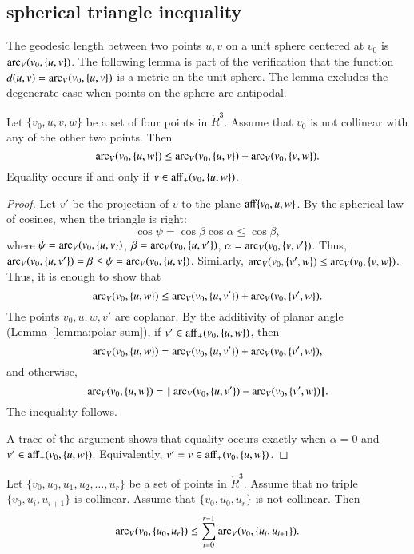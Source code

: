 \subsection{spherical triangle inequality}
%
%

The geodesic length between two points
$u,v$ on a unit sphere centered at $v_0$ is $\operatorname{arc}_V(v_0,\{u,v\})$.
The following lemma is part of the verification that
the function $d(u,v) = \operatorname{arc}_V(v_0,\{u,v\})$ is a metric
on the unit sphere.  The lemma excludes the degenerate case when
points on the sphere are antipodal.
%

\begin{lemma}\label{lemma:sph-tri-ineq}
Let $\{v_0,u,v,w\}$ be a set of four points in $\ring{R}^3$.
Assume that $v_0$ is not collinear with any of the other two points.
Then
   $$
   \operatorname{arc}_V(v_0,\{u,w\}) \le \operatorname{arc}_V(v_0,\{u,v\}) + \operatorname{arc}_V(v_0,\{v,w\}).
   $$
Equality occurs if and only if $v\in{\operatorname{aff}}_+(v_0,\{u,w\})$.
\end{lemma}

\begin{proof} Let $v'$ be the projection of $v$ to the plane
${\operatorname{aff}}\{v_0,u,w\}$.  
By the spherical law of cosines, when the triangle is right:
   $$
   \cos\psi = \cos\beta\cos\alpha \le \cos\beta,
   $$
where $\psi = \operatorname{arc}_V(v_0,\{u,v\})$, $\beta = \operatorname{arc}_V(v_0,\{u,v'\})$, $\alpha=\operatorname{arc}_V(v_0,\{v,v'\})$.
Thus, $\operatorname{arc}_V(v_0,\{u,v'\})=\beta\le \psi=\operatorname{arc}_V(v_0,\{u,v\})$.
Similarly, $\operatorname{arc}_V(v_0,\{v',w\}) \le \operatorname{arc}_V(v_0,\{v,w\})$.
Thus, it is enough to show that 
  $$
  \operatorname{arc}_V(v_0,\{u,w\}) \le \operatorname{arc}_V(v_0,\{u,v'\}) + \operatorname{arc}_V(v_0,\{v',w\}).
  $$
The points $v_0,u,w,v'$ are coplanar.
By the additivity of planar angle (Lemma~\ref{lemma:polar-sum}), if 
$v'\in {\operatorname{aff}}_+(v_0,\{u,w\})$, then
   $$
   \operatorname{arc}_V(v_0,\{u,w\}) = \operatorname{arc}_V(v_0,\{u,v'\}) + \operatorname{arc}_V(v_0,\{v',w\}),   
   $$
and otherwise,
   $$
   \operatorname{arc}_V(v_0,\{u,w\}) = {\hskip0.1em|\hskip-0.15em|\hskip0.1em}\operatorname{arc}_V(v_0,\{u,v'\})  -  \operatorname{arc}_V(v_0,\{v',w\}){\hskip0.1em|\hskip-0.15em|\hskip0.1em}.
   $$
The inequality follows.

A trace of the argument shows that equality occurs exactly when
$\alpha=0$ and $v'\in {\operatorname{aff}}_+(v_0,\{u,w\})$.  Equivalently,
$v'=v\in{\operatorname{aff}}_+(v_0,\{u,w\})$.
\end{proof}

\begin{lemma}
\label{lemma:sph-tri-multi}
Let $\{v_0,u_0,u_1,u_2,\ldots,u_r\}$ be a set of points in $\ring{R}^3$.
Assume that no triple $\{v_0,u_i,u_{i+1}\}$ is collinear.  Assume
that $\{v_0,u_0,u_r\}$ is not collinear.  Then
$$
  \operatorname{arc}_V(v_0,\{u_0,u_r\}) \le \sum_{i=0}^{r-1} \operatorname{arc}_V(v_0,\{u_i,u_{i+1}\}).
$$
\end{lemma}

